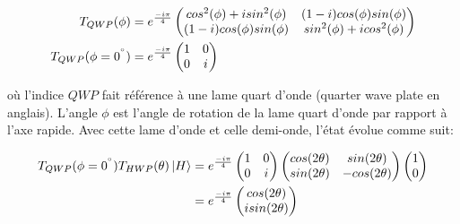 \begin{align}
    T_{QWP}(\phi) &= e^{\frac{-i\pi}{4}}\begin{pmatrix}
        cos^{2}(\phi) + isin^{2}(\phi) & (1-i)cos(\phi)sin(\phi)\\
        (1-i)cos(\phi)sin(\phi) & sin^{2}(\phi) + icos^{2}(\phi)
    \end{pmatrix}\\
    T_{QWP}(\phi = 0^{\degree}) &= e^{\frac{-i\pi}{4}}\begin{pmatrix}
        1 & 0 \\
        0 & i
    \end{pmatrix}
\end{align}

\begin{onehalfspace}
    \noindent où l'indice $QWP$ fait référence 
    à une lame quart d'onde (\guillemetleft quarter wave plate \guillemetright en anglais).
    L'angle $\phi$ est l'angle de rotation de la lame 
    quart d'onde par rapport à l'axe rapide.
    Avec cette lame d'onde et celle demi-onde, l'état évolue comme suit:
\end{onehalfspace}

\begin{align}
    T_{QWP}(\phi = 0^{\degree})T_{HWP}(\theta)\ket{H} &= 
    e^{\frac{-i\pi}{4}}\begin{pmatrix} 
        1 & 0 \\
        0 & i
    \end{pmatrix} 
    \begin{pmatrix}
        cos(2\theta) & sin(2\theta)\\
        sin(2\theta) & -cos(2\theta)
    \end{pmatrix} \begin{pmatrix}
        1\\0
    \end{pmatrix}\\
    &= e^{\frac{-i\pi}{4}}\begin{pmatrix}
        cos(2\theta)\\isin(2\theta)
    \end{pmatrix}
\end{align}

